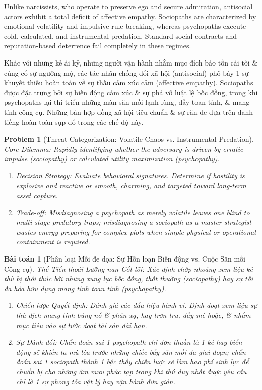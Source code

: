 \documentclass{article}
\newtheorem{problem}{Problem}
\newtheorem{baitoan}{Bài toán}
\begin{document}
Unlike narcissists, who operate to preserve ego and secure admiration, antisocial actors exhibit a total deficit of affective empathy. Sociopaths are characterized by emotional volatility and impulsive rule-breaking, whereas psychopaths execute cold, calculated, and instrumental predation. Standard social contracts and reputation-based deterrence fail completely in these regimes.

Khác với những kẻ ái kỷ, những người vận hành nhằm mục đích bảo tồn cái tôi \& củng cố sự ngưỡng mộ, các tác nhân chống đối xã hội (antisocial) phô bày 1 sự khuyết thiếu hoàn toàn về sự thấu cảm xúc cảm (affective empathy). Sociopaths được đặc trưng bởi sự biến động cảm xúc \& sự phá vỡ luật lệ bốc đồng, trong khi psychopaths lại thi triển những màn săn mồi lạnh lùng, đầy toan tính, \& mang tính công cụ. Những bản hợp đồng xã hội tiêu chuẩn \& sự răn đe dựa trên danh tiếng hoàn toàn sụp đổ trong các chế độ này.

\begin{problem}[Threat Categorization: Volatile Chaos vs. Instrumental Predation]
	\emph{Core Dilemma:} Rapidly identifying whether the adversary is driven by erratic impulse (sociopathy) or calculated utility maximization (psychopathy).
	\begin{enumerate}[label=(\roman*)]
		\item \emph{Decision Strategy:} Evaluate behavioral signatures. Determine if hostility is explosive and reactive or smooth, charming, and targeted toward long-term asset capture.
		\item \emph{Trade-off:} Misdiagnosing a psychopath as merely volatile leaves one blind to multi-stage predatory traps; misdiagnosing a sociopath as a master strategist wastes energy preparing for complex plots when simple physical or operational containment is required.
	\end{enumerate}
\end{problem}
\begin{baitoan}[Phân loại Mối đe dọa: Sự Hỗn loạn Biến động vs. Cuộc Săn mồi Công cụ]
	\emph{Thế Tiến thoái Lưỡng nan Cốt lõi:} Xác định chớp nhoáng xem liệu kẻ thù bị thôi thúc bởi những xung lực bốc đồng, thất thường (sociopathy) hay sự tối đa hóa hữu dụng mang tính toan tính (psychopathy).
	\begin{enumerate}[label=(\roman*)]
		\item \emph{Chiến lược Quyết định:} Đánh giá các dấu hiệu hành vi. Định đoạt xem liệu sự thù địch mang tính bùng nổ \& phản xạ, hay trơn tru, đầy mê hoặc, \& nhắm mục tiêu vào sự tước đoạt tài sản dài hạn.
		\item \emph{Sự Đánh đổi:} Chẩn đoán sai 1 psychopath chỉ đơn thuần là 1 kẻ hay biến động sẽ khiến ta mù lòa trước những chiếc bẫy săn mồi đa giai đoạn; chẩn đoán sai 1 sociopath thành 1 bậc thầy chiến lược sẽ làm hao phí sinh lực để chuẩn bị cho những âm mưu phức tạp trong khi thứ duy nhất được yêu cầu chỉ là 1 sự phong tỏa vật lý hay vận hành đơn giản.
	\end{enumerate}
\end{baitoan}
\end{document}
